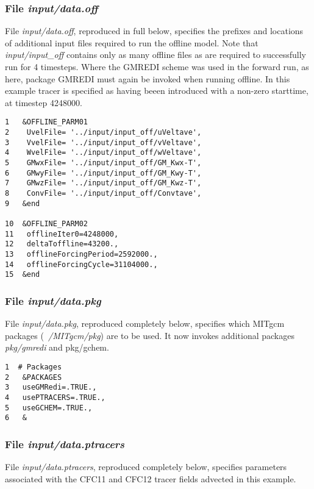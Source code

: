 \subsubsection{File {\it input/data.off}}
\label{www:tutorials}

\noindent File {\it input/data.off}, reproduced in full below,
specifies the prefixes and locations of additional input files
required to run the offline model. Note that {\it input/input\_off}
contains only as many offline files as are required to successfully
run for 4 timesteps. Where the GMREDI scheme was used in the forward
run, as here, package GMREDI must again be invoked when running
offline. In this example tracer is specified as having beeen
introduced with a non-zero starttime, at timestep 4248000.

\begin {verbatim}
1   &OFFLINE_PARM01
2    UvelFile= '../input/input_off/uVeltave',
3    VvelFile= '../input/input_off/vVeltave',
4    WvelFile= '../input/input_off/wVeltave',
5    GMwxFile= '../input/input_off/GM_Kwx-T',
6    GMwyFile= '../input/input_off/GM_Kwy-T',
7    GMwzFile= '../input/input_off/GM_Kwz-T',
8    ConvFile= '../input/input_off/Convtave',
9   &end

10  &OFFLINE_PARM02
11   offlineIter0=4248000,
12   deltaToffline=43200.,
13   offlineForcingPeriod=2592000.,
14   offlineForcingCycle=31104000.,
15  &end
\end{verbatim}

\subsubsection{File {\it input/data.pkg}}
\label{www:tutorials}

\noindent File {\it input/data.pkg}, reproduced completely below,
specifies which MITgcm packages ({\it ~/MITgcm/pkg}) are to be used.
It now invokes additional packages {\it pkg/gmredi} and {pkg/gchem}.

\begin {verbatim}
1  # Packages
2   &PACKAGES
3   useGMRedi=.TRUE.,
4   usePTRACERS=.TRUE.,
5   useGCHEM=.TRUE.,
6   &

\end{verbatim}


\subsubsection{File {\it input/data.ptracers}}
\label{www:tutorials}

\noindent File {\it input/data.ptracers}, reproduced completely below,
specifies parameters associated with the CFC11 and CFC12 tracer fields
advected in this example.


